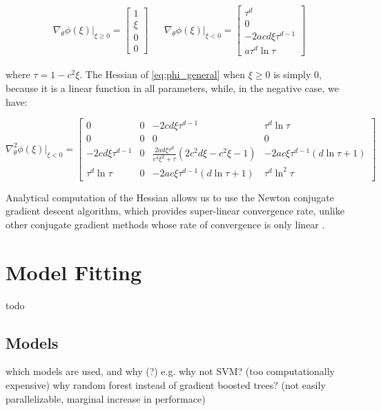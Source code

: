\documentclass[12pt]{book}
\begin{document}
\begin{align}
\nabla_\theta\phi(\xi)\vert_{\xi\geq 0}=\begin{bmatrix}
1 \\ \xi \\ 0 \\ 0
\end{bmatrix} &&
\nabla_\theta\phi(\xi)\vert_{\xi<0}=\begin{bmatrix}
\tau^d \\ 0 \\ -2acd\xi\tau^{d-1} \\ a\tau^d\ln\tau
\end{bmatrix}
\end{align}

where $\tau=1-c^2\xi$. The Hessian of \ref{eq:phi_general} when $\xi\geq 0$ is simply 0, because it is a linear function in all parameters, while, in the negative case, we have:

\begin{equation}
\nabla^2_\theta\phi(\xi)\vert_{\xi<0} = \begin{bmatrix}
0 & 0 & - 2 c d \xi \tau^{d - 1} & \tau^{d} \ln{\tau} \\
0 & 0 & 0 & 0 \\
- 2 c d \xi \tau^{d - 1} &
0 & \frac{2ad\xi\tau^{d}}{c^4\xi^2+\tau}\left(2c^2d\xi-c^2\xi-1\right) & -2ac\xi\tau^{d-1}\left(d\ln\tau+1\right) \\
\tau^d \ln\tau & 0 &
-2ac\xi\tau^{d-1}\left(d\ln\tau+1\right) &
\tau^d\ln^2\tau
\end{bmatrix}
\end{equation}

Analytical computation of the Hessian allows us to use the Newton conjugate gradient descent algorithm, which provides super-linear convergence rate, unlike other conjugate gradient methods whose rate of convergence is only linear \cite{numopt}.

\section{Model Fitting}
todo

\subsection{Models}
which models are used, and why (?)
e.g. why not SVM? (too computationally expensive)
why random forest instead of gradient boosted trees? (not easily parallelizable, marginal increase in performace)
\end{document}
